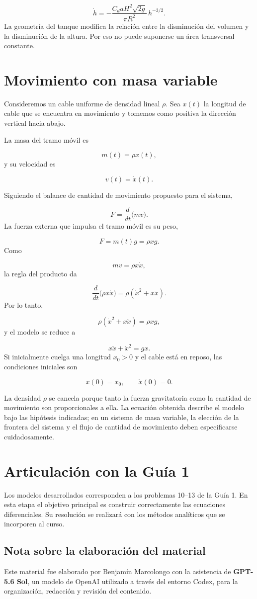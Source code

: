 \documentclass[12pt,a4paper]{article}
\begin{document}
	\[
	\boxed{
	\dot h
	=
	-\frac{C_daH^2\sqrt{2g}}{\pi R^2}\,h^{-3/2}.}
	\]
	\enlargethispage{3\baselineskip}
	La geometría del tanque modifica la relación entre la disminución del volumen y la disminución de la altura. Por eso no puede suponerse un área transversal constante.

	\clearpage
	\section{Movimiento con masa variable}

	Consideremos un cable uniforme de densidad lineal \(\rho\). Sea \(x(t)\) la longitud de cable que se encuentra en movimiento y tomemos como positiva la dirección vertical hacia abajo.

	La masa del tramo móvil es

	\[
	m(t)=\rho x(t),
	\]
	y su velocidad es

	\[
	v(t)=\dot x(t).
	\]

	Siguiendo el balance de cantidad de movimiento propuesto para el sistema,

	\[
	F=\frac{d}{dt}\bigl(mv\bigr).
	\]
	La fuerza externa que impulsa el tramo móvil es su peso,

	\[
	F=m(t)g=\rho xg.
	\]
	Como

	\[
	mv=\rho x\dot x,
	\]
	la regla del producto da

	\[
	\frac{d}{dt}\bigl(\rho x\dot x\bigr)
	=
	\rho\left(\dot x^2+x\ddot x\right).
	\]
	Por lo tanto,

	\[
	\rho\left(\dot x^2+x\ddot x\right)
	=
	\rho xg,
	\]
	y el modelo se reduce a

	\[
	\boxed{x\ddot x+\dot x^2=gx.}
	\]
	Si inicialmente cuelga una longitud \(x_0>0\) y el cable está en reposo, las condiciones iniciales son

	\[
	\boxed{x(0)=x_0,
	\qquad
	\dot x(0)=0.}
	\]

	La densidad \(\rho\) se cancela porque tanto la fuerza gravitatoria como la cantidad de movimiento son proporcionales a ella. La ecuación obtenida describe el modelo bajo las hipótesis indicadas; en un sistema de masa variable, la elección de la frontera del sistema y el flujo de cantidad de movimiento deben especificarse cuidadosamente.

	\clearpage
	\section*{Articulación con la Guía 1}

	Los modelos desarrollados corresponden a los problemas 10--13 de la Guía 1. En esta etapa el objetivo principal es construir correctamente las ecuaciones diferenciales. Su resolución se realizará con los métodos analíticos que se incorporen al curso.

	\subsection*{Nota sobre la elaboración del material}

	Este material fue elaborado por Benjamín Marcolongo con la asistencia de \textbf{GPT-5.6 Sol}, un modelo de OpenAI utilizado a través del entorno Codex, para la organización, redacción y revisión del contenido.
\end{document}
